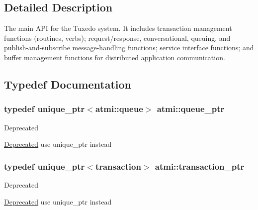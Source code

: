 \subsection{Detailed Description}
The main A\+P\+I for the Tuxedo system. It includes transaction management functions (routines, verbs); request/response, conversational, queuing, and publish-\/and-\/subscribe message-\/handling functions; service interface functions; and buffer management functions for distributed application communication. 

\subsection{Typedef Documentation}
\hypertarget{group__atmi_gaf8c3e342d908ddc295b73c376b7515ca}{
\subsubsection[{queue\+\_\+ptr}]{\setlength{\rightskip}{0pt plus 5cm}typedef unique\+\_\+ptr$<${\bf atmi\+::queue}$>$ {\bf atmi\+::queue\+\_\+ptr}}}\label{group__atmi_gaf8c3e342d908ddc295b73c376b7515ca}
\begin{DoxyRefDesc}{Deprecated}
\item[\hyperlink{deprecated__deprecated000003}{Deprecated}]use unique\+\_\+ptr instead \end{DoxyRefDesc}
\hypertarget{group__atmi_gafc1ae4cdb2829f98c37f27b472fcb867}{
\subsubsection[{transaction\+\_\+ptr}]{\setlength{\rightskip}{0pt plus 5cm}typedef unique\+\_\+ptr$<$transaction$>$ {\bf atmi\+::transaction\+\_\+ptr}}}\label{group__atmi_gafc1ae4cdb2829f98c37f27b472fcb867}
\begin{DoxyRefDesc}{Deprecated}
\item[\hyperlink{deprecated__deprecated000002}{Deprecated}]use unique\+\_\+ptr instead \end{DoxyRefDesc}


